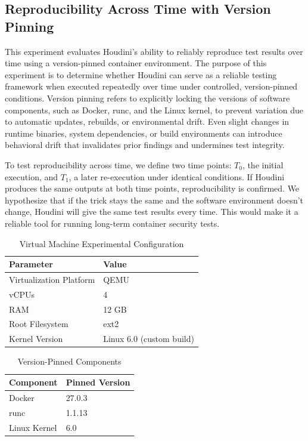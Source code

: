 \documentclass[12pt]{report}
\begin{document}
\begin{doublespace}
\section{Reproducibility Across Time with Version Pinning}

This experiment evaluates Houdini’s ability to reliably reproduce test results over time using a version-pinned container environment. The purpose of this experiment is to determine whether Houdini can serve as a reliable testing framework when executed repeatedly over time under controlled, version-pinned conditions. Version pinning refers to explicitly locking the versions of software components, such as Docker, runc, and the Linux kernel, to prevent variation due to automatic updates, rebuilds, or environmental drift. Even slight changes in runtime binaries, system dependencies, or build environments can introduce behavioral drift that invalidates prior findings and undermines test integrity.

To test reproducibility across time, we define two time points: \( T_0 \), the initial execution, and \( T_1 \), a later re-execution under identical conditions. If Houdini produces the same outputs at both time points, reproducibility is confirmed. We hypothesize that if the trick stays the same and the software environment doesn't change, Houdini will give the same test results every time. This would make it a reliable tool for running long-term container security tests. 

\begin{table}[H]
\centering
\caption{Virtual Machine Experimental Configuration}
\begin{tabular}{|l|l|}
\hline
\textbf{Parameter} & \textbf{Value} \\
\hline
Virtualization Platform & QEMU \\
vCPUs & 4 \\
RAM & 12 GB \\
Root Filesystem & ext2 \\
Kernel Version & Linux 6.0 (custom build) \\
\hline
\end{tabular}
\end{table}

\begin{table}[H]
\centering
\caption{Version-Pinned Components}
\begin{tabular}{|l|l|}
\hline
\textbf{Component} & \textbf{Pinned Version} \\
\hline
Docker & 27.0.3 \\
runc & 1.1.13 \\
Linux Kernel & 6.0 \\
\hline
\end{tabular}
\end{table}


\end{doublespace}
\end{document}
